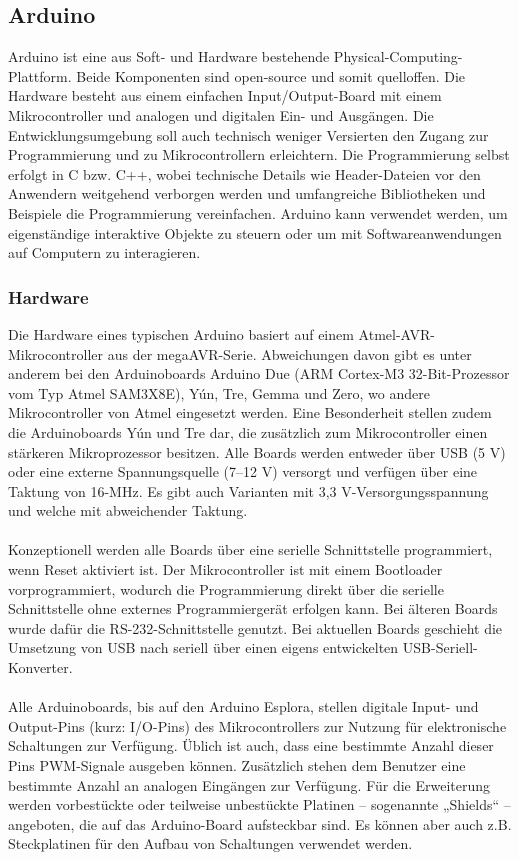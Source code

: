 \subsection{Arduino}

Arduino ist eine aus Soft- und Hardware bestehende Physical-Computing-Plattform. Beide Komponenten sind open-source und somit quelloffen. Die Hardware besteht aus einem einfachen Input/Output-Board mit einem Mikrocontroller und analogen und digitalen Ein- und Ausgängen. Die Entwicklungsumgebung soll auch technisch weniger Versierten den Zugang zur Programmierung und zu Mikrocontrollern erleichtern. Die Programmierung selbst erfolgt in C bzw. C++, wobei technische Details wie Header-Dateien vor den Anwendern weitgehend verborgen werden und umfangreiche Bibliotheken und Beispiele die Programmierung vereinfachen. Arduino kann verwendet werden, um eigenständige interaktive Objekte zu steuern oder um mit Softwareanwendungen auf Computern zu interagieren.

\subsubsection{Hardware}
Die Hardware eines typischen Arduino basiert auf einem Atmel-AVR-Mikrocontroller aus der megaAVR-Serie. Abweichungen davon gibt es unter anderem bei den Arduinoboards Arduino Due (ARM Cortex-M3 32-Bit-Prozessor vom Typ Atmel SAM3X8E), Yún, Tre, Gemma und Zero, wo andere Mikrocontroller von Atmel eingesetzt werden. Eine Besonderheit stellen zudem die Arduinoboards Yún und Tre dar, die zusätzlich zum Mikrocontroller einen stärkeren Mikroprozessor besitzen. Alle Boards werden entweder über USB (5 V) oder eine externe Spannungsquelle (7–12 V) versorgt und verfügen über eine Taktung von 16-MHz. Es gibt auch Varianten mit 3,3 V-Versorgungsspannung und welche mit abweichender Taktung.\\
\\
Konzeptionell werden alle Boards über eine serielle Schnittstelle programmiert, wenn Reset aktiviert ist. Der Mikrocontroller ist mit einem Bootloader vorprogrammiert, wodurch die Programmierung direkt über die serielle Schnittstelle ohne externes Programmiergerät erfolgen kann. Bei älteren Boards wurde dafür die RS-232-Schnittstelle genutzt. Bei aktuellen Boards geschieht die Umsetzung von USB nach seriell über einen eigens entwickelten USB-Seriell-Konverter.\\
\\
Alle Arduinoboards, bis auf den Arduino Esplora, stellen digitale Input- und Output-Pins (kurz: I/O-Pins) des Mikrocontrollers zur Nutzung für elektronische Schaltungen zur Verfügung. Üblich ist auch, dass eine bestimmte Anzahl dieser Pins PWM-Signale ausgeben können. Zusätzlich stehen dem Benutzer eine bestimmte Anzahl an analogen Eingängen zur Verfügung. Für die Erweiterung werden vorbestückte oder teilweise unbestückte Platinen – sogenannte „Shields“ – angeboten, die auf das Arduino-Board aufsteckbar sind. Es können aber auch z.B. Steckplatinen für den Aufbau von Schaltungen verwendet werden.

